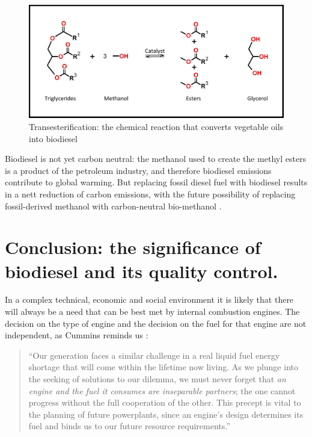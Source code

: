 \begin{figure}
	\centering
	\includegraphics[width=\textwidth]{Figures/Transesterification.pdf}
	\decoRule
	
	\caption[Transesterification]{Transesterification: the chemical reaction that
	converts vegetable oils into biodiesel}
	
	\label{fig:Transesterification}
\end{figure}

Biodiesel is not yet carbon neutral: the methanol used to create the methyl
esters is a product of the petroleum industry, and therefore biodiesel emissions
contribute to global warming. But replacing fossil diesel fuel with biodiesel
results in a nett reduction of carbon emissions, with the future possibility of
replacing fossil-derived methanol with carbon-neutral bio-methanol
\autocite{Shamsul2014}.

\section[The significance of biodiesel ]{Conclusion: the significance of
biodiesel and its quality control.}

In a complex technical, economic and social environment it is likely that there
will always be a need that can be best met by internal combustion engines. The
decision on the type of engine and the decision on the fuel for that engine are
not independent, as Cummins reminds us \autocite{Cummins1989}:

\begin{quotation}
``Our generation faces a similar challenge in a real liquid fuel energy shortage
that will come within the lifetime now living. As we plunge into the seeking of
solutions to our dilemma, we must never forget that \textit{an engine and the
fuel it consumes are inseparable partners}; the one cannot progress without the
full cooperation of the other. This precept is vital to the planning of future
powerplants, since an engine's design determines its fuel and binds us to our
future resource requirements.''
\end{quotation}

